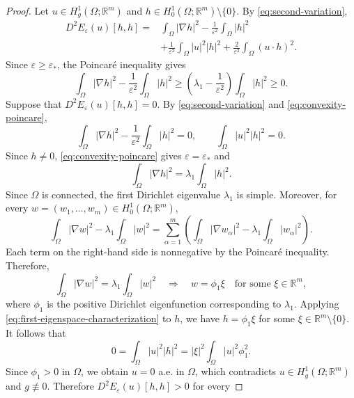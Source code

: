 \documentclass[11pt]{amsart}
\theoremstyle{definition}
\theoremstyle{plain}
\newcommand{\abs}[1]{\lvert#1\rvert}
\newcommand{\R}{\mathbb{R}}
\numberwithin{equation}{section}
\begin{document}
\begin{proof}
	Let $u\in H_g^1(\Omega;\R^m)$ and
	$h\in H_0^1(\Omega;\R^m)\setminus\{0\}$. By
	\eqref{eq:second-variation},
	\[
		\begin{aligned}
		D^2E_\varepsilon(u)[h,h]
		={}&
		\int_\Omega\abs{\nabla h}^2
		-
		\frac{1}{\varepsilon^2}
		\int_\Omega\abs{h}^2\\
		&+
		\frac{1}{\varepsilon^2}
		\int_\Omega\abs{u}^2\abs{h}^2
		+
		\frac{2}{\varepsilon^2}
		\int_\Omega(u\cdot h)^2.
		\end{aligned}
	\]
	Since $\varepsilon\geq\varepsilon_*$, the Poincar\'e inequality gives
	\begin{equation}\label{eq:convexity-poincare}
		\int_\Omega\abs{\nabla h}^2
		-
		\frac{1}{\varepsilon^2}
		\int_\Omega\abs{h}^2
		\geq
		\left(
		\lambda_1-\frac{1}{\varepsilon^2}
		\right)
		\int_\Omega\abs{h}^2
		\geq0.
	\end{equation}
	Suppose that $D^2E_\varepsilon(u)[h,h]=0$. By
	\eqref{eq:second-variation} and \eqref{eq:convexity-poincare},
	\[
		\int_\Omega\abs{\nabla h}^2
		-
		\frac{1}{\varepsilon^2}
		\int_\Omega\abs{h}^2
		=
		0,
		\qquad
		\int_\Omega\abs{u}^2\abs{h}^2
		=
		0.
	\]
	Since $h\neq0$, \eqref{eq:convexity-poincare} gives
	$\varepsilon=\varepsilon_*$ and
	\[
		\int_\Omega\abs{\nabla h}^2
		=
		\lambda_1\int_\Omega\abs{h}^2.
	\]
	Since $\Omega$ is connected, the first Dirichlet eigenvalue
	$\lambda_1$ is simple. Moreover, for every
	$w=(w_1,\ldots,w_m)\in H_0^1(\Omega;\R^m)$,
	\[
		\int_\Omega\abs{\nabla w}^2
		-
		\lambda_1\int_\Omega\abs{w}^2
		=
		\sum_{\alpha=1}^m
		\left(
		\int_\Omega\abs{\nabla w_\alpha}^2
		-
		\lambda_1\int_\Omega\abs{w_\alpha}^2
		\right).
	\]
	Each term on the right-hand side is nonnegative by the Poincar\'e
	inequality. Therefore,
	\begin{equation}\label{eq:first-eigenspace-characterization}
		\int_\Omega\abs{\nabla w}^2
		=
		\lambda_1\int_\Omega\abs{w}^2
		\quad\Longrightarrow\quad
		w=\phi_1\xi
		\quad\text{for some }\xi\in\R^m,
	\end{equation}
	where $\phi_1$ is the positive Dirichlet eigenfunction corresponding
	to $\lambda_1$. Applying
	\eqref{eq:first-eigenspace-characterization} to $h$, we have
	$h=\phi_1\xi$ for some $\xi\in\R^m\setminus\{0\}$. It follows that
	\[
		0
		=
		\int_\Omega\abs{u}^2\abs{h}^2
		=
		\abs{\xi}^2
		\int_\Omega\abs{u}^2\phi_1^2.
	\]
	Since $\phi_1>0$ in $\Omega$, we obtain $u=0$ a.e. in $\Omega$,
	which contradicts $u\in H_g^1(\Omega;\R^m)$ and $g\not\equiv0$.
	Therefore $D^2E_\varepsilon(u)[h,h]>0$ for every

\end{proof}
\end{document}
